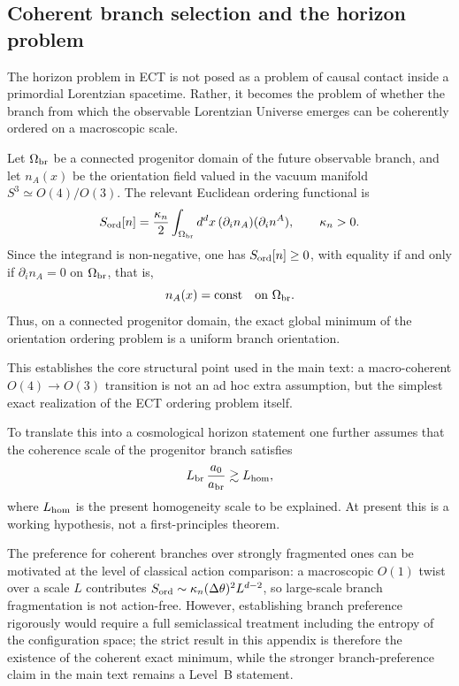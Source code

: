 \documentclass[11pt,a4paper]{article}
\numberwithin{equation}{section}
\begin{document}
\subsection*{Coherent branch selection and the horizon problem}
\label{app:horizon_ect_appendix}

The horizon problem in ECT is not posed as a problem of causal contact
inside a primordial Lorentzian spacetime.
Rather, it becomes the problem of whether the branch from which the
observable Lorentzian Universe emerges can be coherently ordered on a
macroscopic scale.

Let $\Omega_{\rm br}$ be a connected progenitor domain of the future
observable branch, and let $n_A(x)$ be the orientation field valued in
the vacuum manifold $S^3\simeq O(4)/O(3)$.
The relevant Euclidean ordering functional is
\[
S_{\rm ord}[n]
=
\frac{\kappa_n}{2}\int_{\Omega_{\rm br}} d^d x\,
(\partial_i n_A)(\partial_i n^A),
\qquad
\kappa_n>0.
\]
Since the integrand is non-negative, one has
$S_{\rm ord}[n]\ge 0$,
with equality if and only if
$\partial_i n_A = 0$ on $\Omega_{\rm br}$, that is,
\[
n_A(x)=\mathrm{const}\quad\text{on }\Omega_{\rm br}.
\]
Thus, on a connected progenitor domain, the exact global minimum of the
orientation ordering problem is a uniform branch orientation.

This establishes the core structural point used in the main text:
a macro-coherent $O(4)\to O(3)$ transition is not an ad hoc extra
assumption, but the simplest exact realization of the ECT ordering
problem itself.

To translate this into a cosmological horizon statement one further
assumes that the coherence scale of the progenitor branch satisfies
\[
L_{\rm br}\,\frac{a_0}{a_{\rm br}}\gtrsim L_{\rm hom},
\]
where $L_{\rm hom}$ is the present homogeneity scale to be explained.
At present this is a working hypothesis, not a first-principles theorem.

The preference for coherent branches over strongly fragmented ones can
be motivated at the level of classical action comparison:
a macroscopic $O(1)$ twist over a scale $L$ contributes
$S_{\rm ord}\sim \kappa_n(\Delta\theta)^2 L^{d-2}$,
so large-scale branch fragmentation is not action-free.
However, establishing branch preference rigorously would require a full
semiclassical treatment including the entropy of the configuration
space; the strict result in this appendix is therefore the existence of
the coherent exact minimum, while the stronger branch-preference claim
in the main text remains a Level~B statement.
\end{document}
